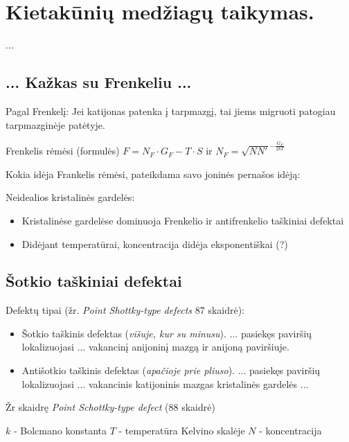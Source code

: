 \chapter{Kietakūnių medžiagų taikymas.}

...


\section{... Kažkas su Frenkeliu ...}

Pagal Frenkelį:
 Jei katijonas patenka į tarpmazgį,
 tai jiems migruoti patogiau tarpmazginėje patėtyje.

\begin{remember}
  \item Frenkelis rėmėsi (formulės) $F = N_F \cdot G_F - T \cdot S$ ir
  $N_F = \sqrt{NN'}^{-\frac{G_F}{2kT}}$
  \item Kokia idėja Frankelis rėmėsi, pateikdama savo joninės pernašos
  idėją:
  \item Neidealios kristalinės gardelės:\begin{itemize}
    \item Kristalinėse gardelėse dominuoja Frenkelio ir antifrenkelio
    taškiniai defektai
    \item Didėjant temperatūrai, koncentracija didėja eksponentiškai (?)
  \end{itemize}   
\end{remember}


\section{Šotkio taškiniai defektai}

Defektų tipai (žr. \textit{Point Shottky-type defects} 87 skaidrė):
\begin{itemize}
  \item Šotkio taškinis defektas (\textit{višuje, kur su minusu}).
  ... pasiekęs paviršių lokalizuojasi ... vakancinį anijoninį mazgą ir
  anijoną paviršiuje.
  \item Antišotkio taškinis defektas (\textit{apačioje prie pliuso}).
  ... pasiekęs paviršių lokalizuojasi ... vakancinis katijoninis mazgas
  kristalinės gardelės ...
\end{itemize}

Žr skaidrę \textit{Point Schottky-type defect} (88 skaidrė)

$k$ - Bolcmano konstanta
$T$ - temperatūra Kelvino skalėje
$N$ - koncentracija 

